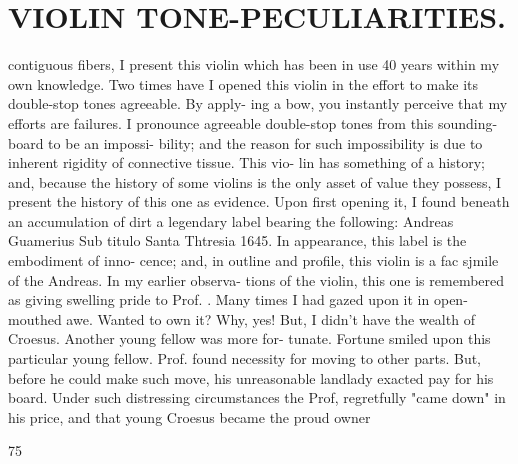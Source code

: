 \documentclass{article}
\begin{document}
\section*{VIOLIN TONE-PECULIARITIES.}
contiguous fibers, I present this violin which has been in use 40 years within my own knowledge. Two times have I opened this violin in the effort to make its double-stop tones agreeable. By apply- ing a bow, you instantly perceive that my efforts are failures. I pronounce agreeable double-stop tones from this sounding-board to be an impossi- bility; and the reason for such impossibility is due to inherent rigidity of connective tissue. This vio- lin has something of a history; and, because the history of some violins is the only asset of value they possess, I present the history of this one as evidence. Upon first opening it, I found beneath an accumulation of dirt a legendary label bearing the following: Andreas Guamerius Sub titulo Santa Thtresia 1645. In appearance, this label is the embodiment of inno- cence; and, in outline and profile, this violin is a fac sjmile of the Andreas. In my earlier observa- tions of the violin, this one is remembered as giving swelling pride to Prof. . Many times I had gazed upon it in open-mouthed awe. Wanted to own it? Why, yes! But, I didn't have the wealth of Croesus. Another young fellow was more for- tunate. Fortune smiled upon this particular young fellow. Prof. found necessity for moving to other parts. But, before he could make such move, his unreasonable landlady exacted pay for his board. Under such distressing circumstances the Prof, regretfully "came down" in his price, and that young Croesus became the proud owner

75
\end{document}

